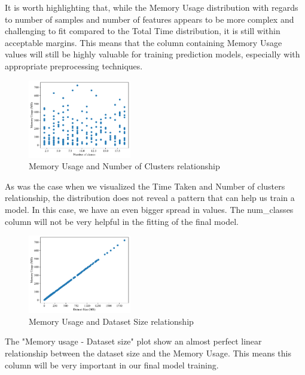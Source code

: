 \documentclass[conference]{IEEEtran}
\begin{document}
It is worth highlighting that, while the Memory Usage distribution with regards to number of samples and number of features appears to be more complex and challenging to fit compared to the Total Time distribution, it is still within acceptable margins. This means that the column containing Memory Usage values will still be highly valuable for training prediction models, especially with appropriate preprocessing techniques.



  \begin{figure}[ht]
      \centering
      \includegraphics[width=0.4\textwidth]{plots/experiment_results/kmeans_memory_classes.pdf}
      \caption{Memory Usage and Number of Clusters relationship}
      \end{figure}

As was the case when we visualized the Time Taken and Number of clusters relationship, the distribution does not reveal a pattern that can help us train a model. In this case, we have an even bigger spread in values. The num\_classes column will not be very helpful in the fitting of the final model.

  \begin{figure}[ht]
      \centering
  \includegraphics[width=0.4\textwidth]{plots/experiment_results/kmeans_memory_dataset_size.pdf}
      \caption{Memory Usage and Dataset Size relationship}
  \end{figure}

\bigbreak
  The "Memory usage - Dataset size" plot show an almost perfect linear relationship between the dataset size and the Memory Usage. This means this column will be very important in our final model training. 
  
\end{document}
